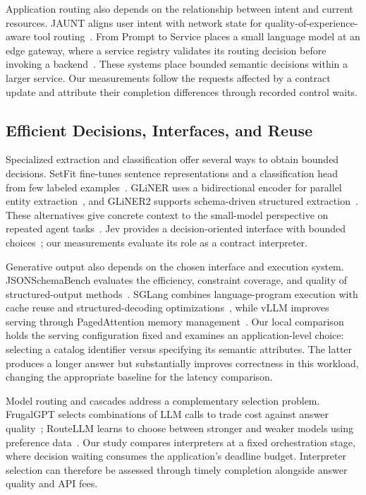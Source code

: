 Application routing also depends on the relationship between intent and current resources. JAUNT aligns user intent with network state for quality-of-experience-aware tool routing~\cite{li2025jaunt}. From Prompt to Service places a small language model at an edge gateway, where a service registry validates its routing decision before invoking a backend~\cite{nisiotis2026prompt}. These systems place bounded semantic decisions within a larger service. Our measurements follow the requests affected by a contract update and attribute their completion differences through recorded control waits.

\subsection{Efficient Decisions, Interfaces, and Reuse}
Specialized extraction and classification offer several ways to obtain bounded decisions. SetFit fine-tunes sentence representations and a classification head from few labeled examples~\cite{tunstall2022efficient}. GLiNER uses a bidirectional encoder for parallel entity extraction~\cite{zaratiana2024gliner}, and GLiNER2 supports schema-driven structured extraction~\cite{zaratiana2025gliner2}. These alternatives give concrete context to the small-model perspective on repeated agent tasks~\cite{belcak2025small}. Jev provides a decision-oriented interface with bounded choices~\cite{typesafe2026systemone}; our measurements evaluate its role as a contract interpreter.

Generative output also depends on the chosen interface and execution system. JSONSchemaBench evaluates the efficiency, constraint coverage, and quality of structured-output methods~\cite{geng2025jsonschemabench}. SGLang combines language-program execution with cache reuse and structured-decoding optimizations~\cite{zheng2023sglang}, while vLLM improves serving through PagedAttention memory management~\cite{kwon2023efficient}. Our local comparison holds the serving configuration fixed and examines an application-level choice: selecting a catalog identifier versus specifying its semantic attributes. The latter produces a longer answer but substantially improves correctness in this workload, changing the appropriate baseline for the latency comparison.

Model routing and cascades address a complementary selection problem. FrugalGPT selects combinations of LLM calls to trade cost against answer quality~\cite{chen2023frugalgptb}; RouteLLM learns to choose between stronger and weaker models using preference data~\cite{ong2024routellma}. Our study compares interpreters at a fixed orchestration stage, where decision waiting consumes the application's deadline budget. Interpreter selection can therefore be assessed through timely completion alongside answer quality and API fees.

